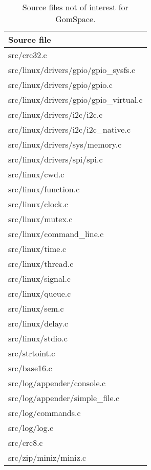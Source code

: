 
\begin{table}[h]
\scriptsize
\centering
\caption{Source files not of interest for GomSpace.}
\label{table:not_interesting}
\begin{tabular}{l}
\hline
\textbf{Source file}\\
\hline
src/crc32.c\\
src/linux/drivers/gpio/gpio\_sysfs.c\\
src/linux/drivers/gpio/gpio.c\\
src/linux/drivers/gpio/gpio\_virtual.c\\
src/linux/drivers/i2c/i2c.c\\
src/linux/drivers/i2c/i2c\_native.c\\
src/linux/drivers/sys/memory.c\\
src/linux/drivers/spi/spi.c\\
src/linux/cwd.c\\
src/linux/function.c\\
src/linux/clock.c\\
src/linux/mutex.c\\
src/linux/command\_line.c\\
src/linux/time.c\\
src/linux/thread.c\\
src/linux/signal.c\\
src/linux/queue.c\\
src/linux/sem.c\\
src/linux/delay.c\\
src/linux/stdio.c\\
src/strtoint.c\\
src/base16.c\\
src/log/appender/console.c\\
src/log/appender/simple\_file.c\\
src/log/commands.c\\
src/log/log.c\\
src/crc8.c\\
src/zip/miniz/miniz.c\\
\hline
\end{tabular}
\end{table}